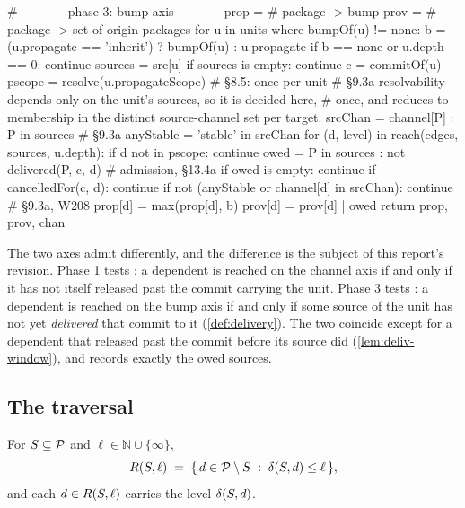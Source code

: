 \begin{speccode}[fontsize=\footnotesize]
    # ---------- phase 3: bump axis ----------
    prop = {}                                   # package -> bump
    prov = {}                                   # package -> set of origin packages
    for u in units where bumpOf(u) != none:
        b = (u.propagate == 'inherit') ? bumpOf(u) : u.propagate
        if b == none or u.depth == 0:                continue
        sources = src[u]
        if sources is empty:                        continue
        c       = commitOf(u)
        pscope  = resolve(u.propagateScope)                        # §8.5: once per unit
        # §9.3a resolvability depends only on the unit's sources, so it is decided here,
        # once, and reduces to membership in the distinct source-channel set per target.
        srcChan   = { channel[P] : P in sources }                  # §9.3a
        anyStable = 'stable' in srcChan
        for (d, level) in reach(edges, sources, u.depth):
            if d not in pscope:                           continue
            owed = { P in sources : not delivered(P, c, d) }    # admission, §13.4a
            if owed is empty:                             continue
            if cancelledFor(c, d):                        continue
            if not (anyStable or channel[d] in srcChan):  continue # §9.3a, W208
            prop[d] = max(prop[d], b)
            prov[d] = prov[d] | owed
    return prop, prov, chan
\end{speccode}

The two axes admit differently, and the difference is the subject of this
report's revision. Phase 1 tests : a dependent is
reached on the channel axis if and only if it has not itself released past the
commit carrying the unit. Phase 3 tests : a dependent is
reached on the bump axis if and only if some source of the unit has not yet
\emph{delivered} that commit to it (\cref{def:delivery}). The two coincide
except for a dependent that released past the commit before its source did
(\cref{lem:deliv-window}), and  records exactly the owed
sources.

\subsection{The traversal}

\begin{definition}
\label{def:reach}
For $S \subseteq \mathcal{P}$ and $\ell \in \mathbb{N}\cup\{\infty\}$,
\[
  R(S,\ell) \;=\;
  \{\, d \in \mathcal{P} \setminus S \;:\; \delta(S,d) \leq \ell \,\},
\]
and each $d \in R(S,\ell)$ carries the level $\delta(S,d)$.
\end{definition}


